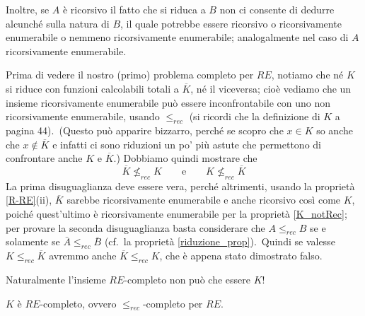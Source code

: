 \noindent Inoltre, se $A$ è ricorsivo il fatto che si riduca a $B$ non ci consente di dedurre alcunché sulla natura di $B$, il quale potrebbe essere ricorsivo o ricorsivamente enumerabile o nemmeno ricorsivamente enumerabile; analogalmente nel caso di $A$ ricorsivamente enumerabile.\

Prima di vedere il nostro (primo) problema completo per $RE$, notiamo che né $K$ si riduce con funzioni calcolabili totali a $\overline{K}$, né il viceversa; cioè vediamo che un insieme ricorsivamente enumerabile può essere inconfrontabile con uno non ricorsivamente enumerabile, usando $\leqslant_{rec}$ (si ricordi che la definizione di $K$ a pagina 44).\
(Questo può apparire bizzarro, perché se scopro che $x \in K$ so anche che $x \notin \overline{K}$ e infatti ci sono riduzioni un po' più astute che permettono di confrontare anche $K$ e $\overline{K}$.)
Dobbiamo quindi mostrare che
\[\overline{K} \nleqslant_{rec} K\qquad \mathrm{e} \qquad K \nleqslant_{rec} \overline{K}\]
La prima disuguaglianza deve essere vera, perché altrimenti, usando la proprietà \ref{R-RE}(ii), $\overline{K}$ sarebbe ricorsivamente enumerabile e anche ricorsivo così come $K$, poiché quest'ultimo è ricorsivamente enumerabile per la proprietà \ref{K_notRec}; per provare la seconda disuguaglianza basta considerare che $A \leqslant_{rec} B$ se e solamente se $\bar{A} \leqslant_{rec} \overline{B}$ (cf.\ la proprietà \ref{riduzione_prop}).\
Quindi se valesse $K \leqslant_{rec} \overline{K}$ avremmo anche $\overline{K} \leqslant_{rec} K$, che è appena stato dimostrato falso.

\begin{center}
    Naturalmente l'insieme $RE$-completo non può che essere $K$!
\end{center}

\begin{theorem}
    $K$ è $RE$-completo, ovvero $\leqslant_{rec}$-completo per $RE$.
\end{theorem}

